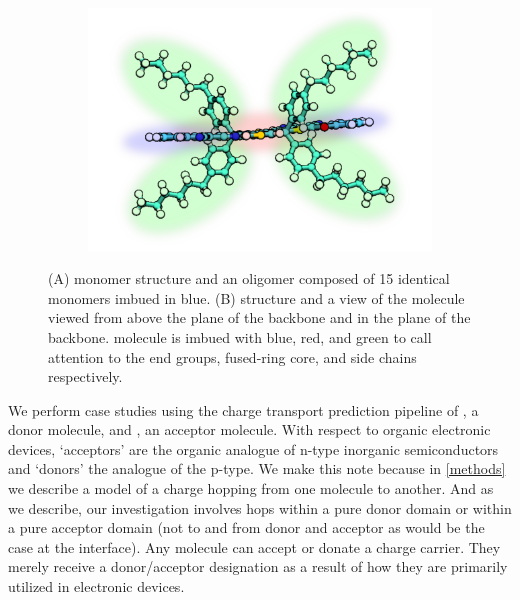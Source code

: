 \begin{figure}
\begin{subfigure}{.3\textwidth}
\end{subfigure}%
\begin{subfigure}{.3\textwidth}
    \centering
    \includegraphics[width=\textwidth]{figures/itic-sidechain-figure.png}
\end{subfigure}
    \caption[]{(A)  monomer structure and an oligomer
    composed of 15 identical monomers imbued in blue.
    (B)  structure  and a view of the molecule viewed from
    above the plane of the backbone and in the plane of the backbone. 
    molecule is imbued with blue, red, and green to call attention to the end groups, fused-ring core, and
    side chains respectively.}
\label{molecules}
\end{figure}

We perform case studies using the charge transport prediction pipeline of , a
donor molecule, and , an acceptor molecule. With respect to organic electronic devices, `acceptors' are the
organic analogue of n-type inorganic semiconductors and `donors' the analogue
of the p-type. We make this note because in \autoref{methods} we describe a model of
a charge hopping from one molecule to another. And as we describe, our
investigation involves hops within a pure donor domain or within a pure
acceptor domain (not to and from donor and acceptor as would be the case at the interface). 
Any molecule can accept or donate a charge carrier.
They merely receive a donor/acceptor designation as a result of how they
are primarily utilized in electronic devices. 

